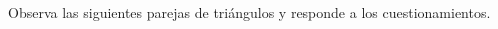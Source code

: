 \question[20] Observa las siguientes parejas de tri\'angulos y responde a los cuestionamientos.

\begin{multicols}{2}
    \begin{parts}
        
        
        
        
    \end{parts}
\end{multicols}